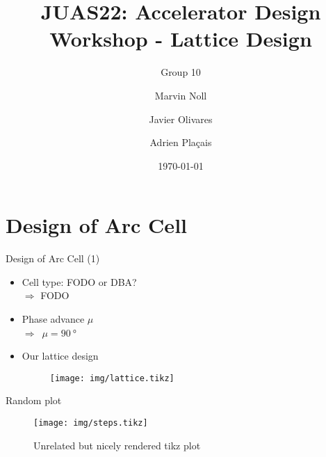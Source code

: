 \documentclass{beamer}
\title[Topic III: Lattice Design]{JUAS22: Accelerator Design Workshop - Lattice Design}
\subtitle{Group 10}
\author[Noll, Olivares, Plaçais]{Marvin Noll \and Javier Olivares \and Adrien Plaçais}
\date[\today]{\today}
\begin{document}
\begin{frame}[plain]
  \titlepage
  \end{frame}

\section{Design of Arc Cell}
\begin{frame}[t]{Design of Arc Cell (1)}
\begin{itemize}
\item Cell type: FODO or DBA?\\$\Rightarrow$ FODO
\item Phase advance $\mu$\\$\Rightarrow$~$\mu=\SI{90}{\degree}$
\item Our lattice design
\begin{figure}
\centering
\texttt{[image: img/lattice.tikz]}
\end{figure}
\end{itemize}
\end{frame}

\begin{frame}[t]{Random plot}
\begin{figure}
\centering
\texttt{[image: img/steps.tikz]}
\caption{Unrelated but nicely rendered tikz plot}
\end{figure}
\end{frame}
\end{document}
